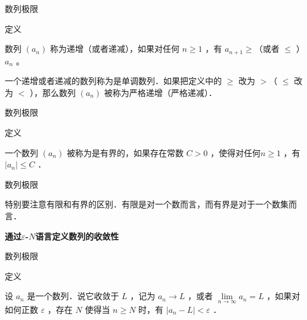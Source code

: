 \documentclass[aspectratio=169,10pt,fontset=fandol]{ctexbeamer}
\begin{document}
\begin{frame}[t,fragile]{数列极限}
\normalsize
\begin{block}{定义}
{\normalsize


	数列 $\left(a_n\right)$ 称为递增（或者递减），如果对任何 $n \geqslant 1$ ，有 $a_{n+1} \geqslant$（或者 $\leqslant$ ）$a_n$ 。

	一个递增或者递减的数列称为是单调数列．如果把定义中的 $\geqslant$ 改为 $>$（ $\leqslant$ 改为 $<$ ），那么数列 $\left(a_n\right)$ 被称为严格递增（严格递减）．


}
\end{block}
\end{frame}
\begin{frame}[t,fragile]{数列极限}
\normalsize
\begin{block}{定义}
{\normalsize


	 一个数列 $\left(a_n\right)$ 被称为是有界的，如果存在常数 $C>0$ ，使得对任何$n \geqslant 1$ ，有 $\left|a_n\right| \leqslant C$ ．


}
\end{block}
\end{frame}
\begin{frame}[t,fragile]{数列极限}
\normalsize
{\normalsize








特别要注意有限和有界的区别．有限是对一个数而言，而有界是对于一个数集而言．





\textbf{通过\texorpdfstring{\(\varepsilon\)-\(N\)语言定义数列的收敛性}{epsilon-N 定义}}










}
\end{frame}
\begin{frame}[t,fragile]{数列极限}
\normalsize
\begin{block}{定义}
{\normalsize


设 $a_n$ 是一个数列．说它收敛于 $L$ ，记为 $a_n \rightarrow L$ ，或者 $\lim \limits_{n \to \infty} a_n=L$ ，如果对如何正数 $\varepsilon$ ，存在 $N$ 使得当 $n \geqslant N$ 时，有 $\left|a_n-L\right|<\varepsilon$ ．


}
\end{block}
\end{frame}
\end{document}
